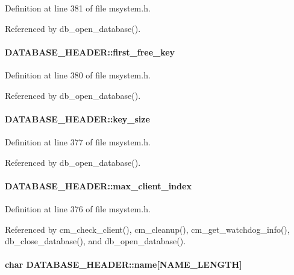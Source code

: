 Definition at line 381 of file msystem.h.

Referenced by db\_\-open\_\-database().
\paragraph[{first\_\-free\_\-key}]{ {\bf DATABASE\_\-HEADER::first\_\-free\_\-key}}\hfill\label{structDATABASE__HEADER_a159c56729de1f0588f729766a2065e0c}


Definition at line 380 of file msystem.h.

Referenced by db\_\-open\_\-database().
\paragraph[{key\_\-size}]{ {\bf DATABASE\_\-HEADER::key\_\-size}}\hfill\label{structDATABASE__HEADER_aff611de1699a1800a6c9feb1657641c4}


Definition at line 377 of file msystem.h.

Referenced by db\_\-open\_\-database().
\paragraph[{max\_\-client\_\-index}]{ {\bf DATABASE\_\-HEADER::max\_\-client\_\-index}}\hfill\label{structDATABASE__HEADER_af32aa8de562b4b0a49b5a69ae751a05d}


Definition at line 376 of file msystem.h.

Referenced by cm\_\-check\_\-client(), cm\_\-cleanup(), cm\_\-get\_\-watchdog\_\-info(), db\_\-close\_\-database(), and db\_\-open\_\-database().
\paragraph[{name}]{\setlength{\rightskip}{0pt plus 5cm}char {\bf DATABASE\_\-HEADER::name}\mbox{[}NAME\_\-LENGTH\mbox{]}}\hfill\label{structDATABASE__HEADER_a81b89531550d60ad5fd1b93777ee4b9e}


